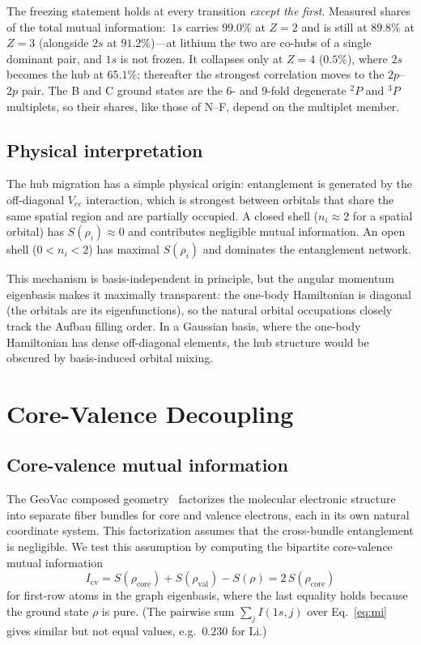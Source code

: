 \documentclass[twocolumn,pra,amsmath,amssymb,superscriptaddress]{revtex4-2}
\begin{document}
The freezing statement holds at every transition \emph{except the first}.
Measured shares of the total mutual information:\ $1s$ carries $99.0\%$ at
$Z=2$ and is still at $89.8\%$ at $Z=3$ (alongside $2s$ at $91.2\%$)---at
lithium the two are co-hubs of a single dominant pair, and $1s$ is not
frozen.  It collapses only at $Z=4$ ($0.5\%$), where $2s$ becomes the hub
at $65.1\%$; thereafter the strongest correlation moves to the
$2p$--$2p$ pair.  The B and C ground states are the $6$- and $9$-fold
degenerate ${}^2P$ and ${}^3P$ multiplets, so their shares, like those
of N--F, depend on the multiplet member.

\subsection{Physical interpretation}

The hub migration has a simple physical origin: entanglement is
generated by the off-diagonal $V_{ee}$ interaction, which is
strongest between orbitals that share the same spatial region and
are partially occupied.  A closed shell ($n_i \approx 2$ for a
spatial orbital) has $S(\rho_i) \approx 0$ and contributes
negligible mutual information.  An open shell
($0 < n_i < 2$) has maximal $S(\rho_i)$ and dominates the
entanglement network.

This mechanism is basis-independent in principle, but the angular
momentum eigenbasis makes it maximally transparent: the one-body
Hamiltonian is diagonal (the orbitals are its eigenfunctions), so the
natural orbital occupations closely track the Aufbau filling
order.  In a Gaussian basis, where the one-body Hamiltonian has
dense off-diagonal elements, the hub structure would be obscured
by basis-induced orbital mixing.

\section{Core-Valence Decoupling}
\label{sec:corevalence}

\subsection{Core-valence mutual information}

The GeoVac composed geometry~\cite{GeoVac_Paper17} factorizes the
molecular electronic structure into separate fiber bundles for
core and valence electrons, each in its own natural coordinate
system.  This factorization assumes that the cross-bundle
entanglement is negligible.  We test this assumption by computing
the bipartite core-valence mutual information
\begin{equation}
  I_{\text{cv}} = S(\rho_{\text{core}}) + S(\rho_{\text{val}})
  - S(\rho) = 2\,S(\rho_{\text{core}})
  \label{eq:icv}
\end{equation}
for first-row atoms in the graph eigenbasis, where the last equality
holds because the ground state $\rho$ is pure.  (The pairwise sum
$\sum_{j}I(1s,j)$ over Eq.~\eqref{eq:mi} gives similar but not equal
values, e.g.\ $0.230$ for Li.)
\end{document}
